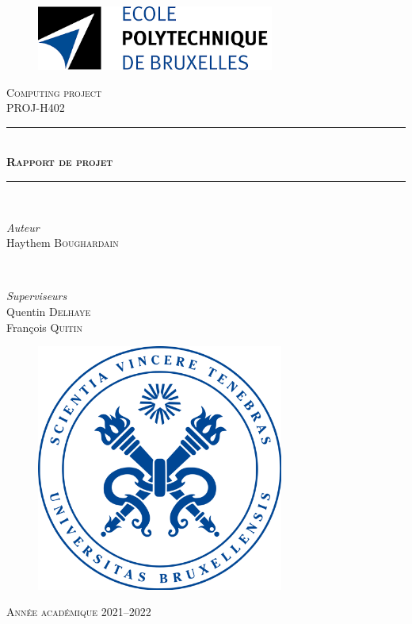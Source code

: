 \center
    \newcommand{\HRule}{\rule{\linewidth}{0.5mm}} 
    
    \begin{figure}
       \centering
      \includegraphics[height=60pt]{images/logo-epb.png}
    \end{figure}
    
    \textsc{\Large Computing project}\\[0.5cm] 
	\textsc{\Large PROJ-H402}\\[0.5cm]

    \vspace{1cm}

	\HRule\\[0.4cm]
	{\huge\bfseries\textsc{Rapport de projet}}\\[0.3cm] 
	\HRule\\[1.5cm]


    \begin{minipage}{0.5\textwidth}
		\begin{flushleft}
			\large
			\textit{Auteur}\\
			Haythem \textsc{Boughardain}
        \end{flushleft}
    \end{minipage}
        ~
	\begin{minipage}{0.4\textwidth}
		\begin{flushright}
			\large
			\textit{Superviseurs}\\
			Quentin \textsc{Delhaye}\\
			François \textsc{Quitin}
		\end{flushright}
	\end{minipage}
        
    \vspace{1cm}
	\begin{figure}[h!]
	   \centering
	  \includegraphics[height=230pt]{images/logo-ulb.png}
	\end{figure}
    \vspace*{\fill}

	{\large \textsc{Année académique 2021--2022}}